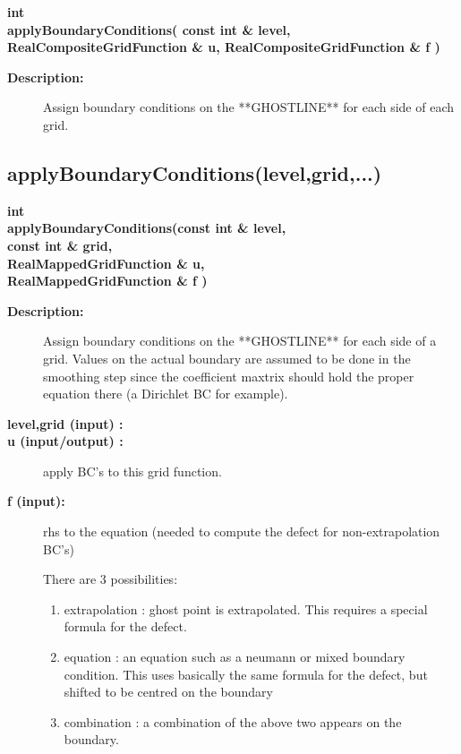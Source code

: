 \begin{flushleft} \textbf{%
int  \\ 
\settowidth{\OgmgIncludeArgIndent}{applyBoundaryConditions(}%
applyBoundaryConditions( const int \& level, RealCompositeGridFunction \& u, RealCompositeGridFunction \& f )
}\end{flushleft}
 
\begin{description}
\item[{\bf Description:}] 
    Assign boundary conditions on the **GHOSTLINE**  for each side of each grid.

\end{description}
\subsection{applyBoundaryConditions(level,grid,...)}
 
\begin{flushleft} \textbf{%
int  \\ 
\settowidth{\OgmgIncludeArgIndent}{applyBoundaryConditions(}%
applyBoundaryConditions(const int \& level, \\ 
\hspace{\OgmgIncludeArgIndent}const int \& grid, \\ 
\hspace{\OgmgIncludeArgIndent}RealMappedGridFunction \& u, \\ 
\hspace{\OgmgIncludeArgIndent}RealMappedGridFunction \& f )
}\end{flushleft}
\begin{description}
\item[{\bf Description:}] 
    Assign boundary conditions on the **GHOSTLINE**  for each side of a grid.
  Values on the actual boundary are assumed to be done in the smoothing step since the
 coefficient maxtrix should hold the proper equation there (a Dirichlet BC for example).
\item[{\bf level,grid (input) :}] 
\item[{\bf u (input/output) :}]  apply BC's to this grid function.
\item[{\bf f (input):}]  rhs to the equation (needed to compute the defect for non-extrapolation BC's)

 There are 3 possibilities:
 \begin{enumerate}
   \item extrapolation : ghost point is extrapolated. This requires a special formula for the defect.
   \item equation : an equation such as a neumann or mixed boundary condition. This uses basically the
                same formula for the defect, but shifted to be centred on the boundary
   \item combination : a combination of the above two appears on the boundary.
 \end{enumerate}
\end{description}

